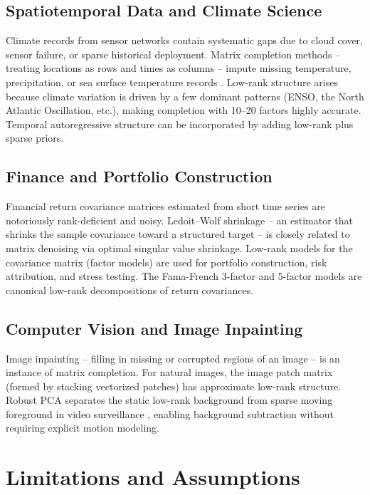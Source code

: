 \documentclass[conference]{IEEEtran}
\begin{document}
\subsection{Spatiotemporal Data and Climate Science}

Climate records from sensor networks contain systematic gaps due to cloud cover, sensor failure, or sparse historical deployment. Matrix completion methods -- treating locations as rows and times as columns -- impute missing temperature, precipitation, or sea surface temperature records \cite{chen2021scalable}. Low-rank structure arises because climate variation is driven by a few dominant patterns (ENSO, the North Atlantic Oscillation, etc.), making completion with 10--20 factors highly accurate. Temporal autoregressive structure can be incorporated by adding low-rank plus sparse priors.

\subsection{Finance and Portfolio Construction}

Financial return covariance matrices estimated from short time series are notoriously rank-deficient and noisy. Ledoit--Wolf shrinkage \cite{ledoit2004well} -- an estimator that shrinks the sample covariance toward a structured target -- is closely related to matrix denoising via optimal singular value shrinkage. Low-rank models for the covariance matrix (factor models) are used for portfolio construction, risk attribution, and stress testing. The Fama-French 3-factor and 5-factor models are canonical low-rank decompositions of return covariances.

\subsection{Computer Vision and Image Inpainting}

Image inpainting -- filling in missing or corrupted regions of an image -- is an instance of matrix completion. For natural images, the image patch matrix (formed by stacking vectorized patches) has approximate low-rank structure. Robust PCA separates the static low-rank background from sparse moving foreground in video surveillance \cite{wright2009robust}, enabling background subtraction without requiring explicit motion modeling.

\section{Limitations and Assumptions}
\label{sec:limits}
\end{document}
